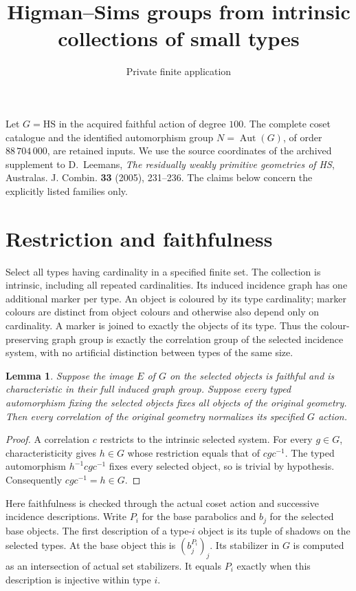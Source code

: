 \documentclass[11pt]{article}
\title{Higman--Sims groups from intrinsic collections of small types}
\author{Private finite application}\date{}
\newtheorem{lemma}{Lemma}\newtheorem{theorem}[lemma]{Theorem}
\newcommand{\Aut}{\operatorname{Aut}}\newcommand{\Cor}{\operatorname{Cor}}
\begin{document}
\maketitle
Let $G=\mathrm{HS}$ in the acquired faithful action of degree $100$.
The complete coset catalogue and the identified automorphism group
$N=\Aut(G)$, of order $88\,704\,000$, are retained inputs.
We use the source coordinates of the archived supplement to D.~Leemans,
\emph{The residually weakly primitive geometries of HS},
Australas. J. Combin. \textbf{33} (2005), 231--236.
The claims below concern the explicitly listed families only.

\section*{Restriction and faithfulness}
Select all types having cardinality in a specified finite set.
The collection is intrinsic, including all repeated cardinalities.
Its induced incidence graph has one additional marker per type.
An object is coloured by its type cardinality; marker colours are
distinct from object colours and otherwise also depend only on
cardinality. A marker is joined to exactly the objects of its type.
Thus the colour-preserving graph group is exactly the correlation group
of the selected incidence system, with no artificial distinction between
types of the same size.

\begin{lemma}
Suppose the image $E$ of $G$ on the selected objects is faithful and is
characteristic in their full induced graph group. Suppose every typed
automorphism fixing the selected objects fixes all objects of the
original geometry. Then every correlation of the original geometry
normalizes its specified $G$ action.
\end{lemma}
\begin{proof}
A correlation $c$ restricts to the intrinsic selected system. For every
$g\in G$, characteristicity gives $h\in G$ whose restriction equals
that of $cgc^{-1}$. The typed automorphism $h^{-1}cgc^{-1}$ fixes every
selected object, so is trivial by hypothesis. Consequently
$cgc^{-1}=h\in G$.
\end{proof}

Here faithfulness is checked through the actual coset action and
successive incidence descriptions. Write $P_i$ for the base parabolics
and $b_j$ for the selected base objects. The first description of a
type-$i$ object is its tuple of shadows on the selected types. At the
base object this is $(b_j^{P_i})_j$. Its stabilizer in $G$ is computed
as an intersection of actual set stabilizers. It equals $P_i$ exactly
when this description is injective within type $i$.
\end{document}
